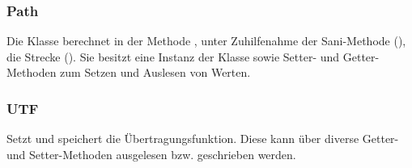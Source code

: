 \subsubsection*{Path}
Die   Klasse     berechnet  in   der  Methode   ,
unter   Zuhilfenahme  der   Sani-Methode  (),   die  Strecke
(). Sie besitzt  eine Instanz  der Klasse   sowie Setter-
und Getter-Methoden zum Setzen und Auslesen von Werten.


\subsubsection*{UTF}
Setzt  und speichert  die  \"Ubertragungsfunktion. Diese  kann \"uber  diverse
Getter- und Setter-Methoden ausgelesen bzw. geschrieben werden.
